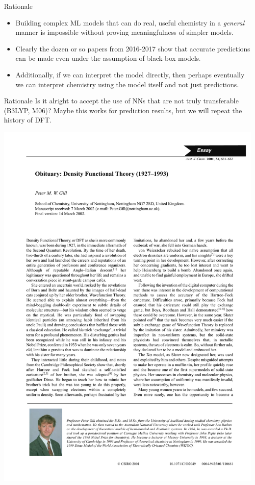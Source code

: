 \documentclass[xetex,compress]{beamer}
\begin{document}
\begin{frame}{Rationale}
  \begin{itemize}
  \item Building complex ML models that can do real, useful chemistry in a \emph{general} manner is impossible without proving meaningfulness of simpler models.
  \item Clearly the dozen or so papers from 2016-2017 show that accurate predictions can be made even under the assumption of black-box models.
  \item Additionally, if we can interpret the model directly, then perhaps eventually we can interpret chemistry using the model itself and not just predictions.
  \end{itemize}
\end{frame}

\begin{frame}{Rationale}
  Is it alright to accept the use of NNs that are not truly transferable (B3LYP, M06)? Maybe this works for prediction results, but we will repeat the history of DFT.
  \begin{center}
    \includegraphics[width=1.00\textwidth]{./figures/obit.pdf}
  \end{center}
\end{frame}
\end{document}
